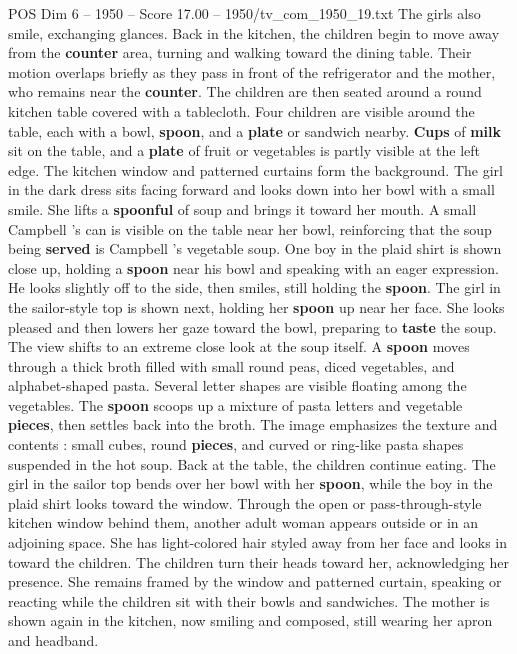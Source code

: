 \begin{textsample}{POS Dim 6 – 1950 – Score 17.00 – 1950/tv\_com\_1950\_19.txt}
The girls also smile, exchanging glances.
Back in the kitchen, the children begin to move away from the \textbf{counter} area, turning and walking toward the dining table.
Their motion overlaps briefly as they pass in front of the refrigerator and the mother, who remains near the \textbf{counter}.
The children are then seated around a round kitchen table covered with a tablecloth.
Four children are visible around the table, each with a bowl, \textbf{spoon}, and a \textbf{plate} or sandwich nearby. \textbf{Cups} of \textbf{milk} sit on the table, and a \textbf{plate} of fruit or vegetables is partly visible at the left edge.
The kitchen window and patterned curtains form the background.
The girl in the dark dress sits facing forward and looks down into her bowl with a small smile.
She lifts a \textbf{spoonful} of soup and brings it toward her mouth.
A small Campbell ’s can is visible on the table near her bowl, reinforcing that the soup being \textbf{served} is Campbell ’s vegetable soup.
One boy in the plaid shirt is shown close up, holding a \textbf{spoon} near his bowl and speaking with an eager expression.
He looks slightly off to the side, then smiles, still holding the \textbf{spoon}.
The girl in the sailor-style top is shown next, holding her \textbf{spoon} up near her face.
She looks pleased and then lowers her gaze toward the bowl, preparing to \textbf{taste} the soup.
The view shifts to an extreme close look at the soup itself.
A \textbf{spoon} moves through a thick broth filled with small round peas, diced vegetables, and alphabet-shaped pasta.
Several letter shapes are visible floating among the vegetables.
The \textbf{spoon} scoops up a mixture of pasta letters and vegetable \textbf{pieces}, then settles back into the broth.
The image emphasizes the texture and contents : small cubes, round \textbf{pieces}, and curved or ring-like pasta shapes suspended in the hot soup.
Back at the table, the children continue eating.
The girl in the sailor top bends over her bowl with her \textbf{spoon}, while the boy in the plaid shirt looks toward the window.
Through the open or pass-through-style kitchen window behind them, another adult woman appears outside or in an adjoining space.
She has light-colored hair styled away from her face and looks in toward the children.
The children turn their heads toward her, acknowledging her presence.
She remains framed by the window and patterned curtain, speaking or reacting while the children sit with their bowls and sandwiches.
The mother is shown again in the kitchen, now smiling and composed, still wearing her apron and headband.

\end{textsample}
